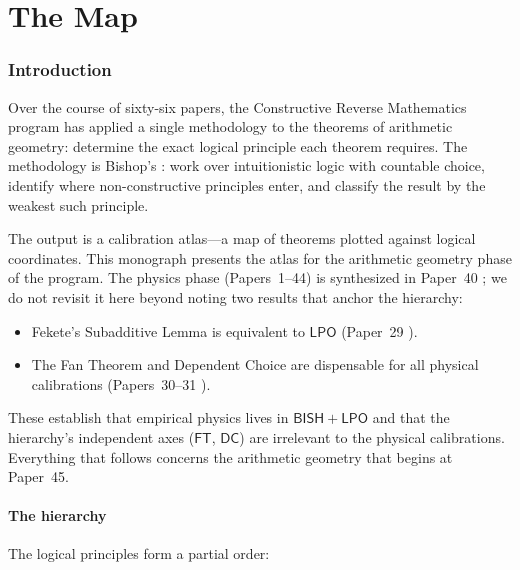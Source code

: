 \documentclass[11pt]{article}
\theoremstyle{plain}
\theoremstyle{definition}
\theoremstyle{remark}
\newcommand{\BISH}{\mathsf{BISH}}
\newcommand{\LPO}{\mathsf{LPO}}
\newcommand{\FT}{\mathsf{FT}}
\newcommand{\DC}{\mathsf{DC}}
\begin{document}
\part{The Map}\label{part:map}

\section{Introduction}\label{sec:intro}

Over the course of sixty-six papers, the Constructive Reverse
Mathematics program has applied a single methodology to the
theorems of arithmetic geometry: determine the exact logical
principle each theorem requires.  The methodology is Bishop's
\cite{Bishop1967, BridgesRichman1987}: work over intuitionistic
logic with countable choice, identify where non-constructive
principles enter, and classify the result by the weakest such
principle.

The output is a calibration atlas---a map of theorems plotted
against logical coordinates.  This monograph presents the atlas
for the arithmetic geometry phase of the program.  The physics
phase (Papers~1--44) is synthesized in Paper~40 \cite{Paper40};
we do not revisit it here beyond noting two results that anchor
the hierarchy:

\begin{itemize}[nosep]
\item Fekete's Subadditive Lemma is equivalent to $\LPO$
  (Paper~29 \cite{Paper29}).
\item The Fan Theorem and Dependent Choice are dispensable for all
  physical calibrations (Papers~30--31 \cite{Paper30, Paper31}).
\end{itemize}

\noindent
These establish that empirical physics lives in $\BISH + \LPO$ and
that the hierarchy's independent axes ($\FT$, $\DC$) are
irrelevant to the physical calibrations.  Everything that follows
concerns the arithmetic geometry that begins at Paper~45.


\subsection{The hierarchy}\label{sec:hierarchy}

The logical principles form a partial order:
\end{document}
